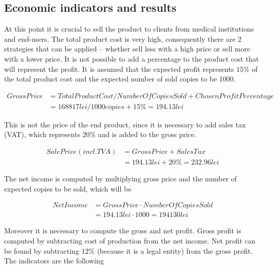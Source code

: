 \documentclass[12pt,a4paper]{report}
\begin{document}
\subsection{Economic indicators and results}
At this point it is crucial to sell the product to clients from medical institutions and end-users. The total product cost is very high, consequently there are 2 strategies that can be applied -- whether sell less with a high price or sell more with a lower price. It is not possible to add a percentage to the product cost that will represent the profit. It is assumed that the expected profit represents $15\%$ of the total product cost and the expected number of sold copies to be 1000. 

\begin{equation}
 \begin{split}
  Gross Price &= Total Product Cost / Number Of Copies Sold + Chosen Profit Percentage\\
              &= 168817 lei/1000 copies + 15\% = 194.13 lei
 \end{split}
\end{equation}

This is not the price of the end product, since it is necessary to add sales tax (VAT), which represents $20\%$ and is added to the gross price. 

\begin{equation}
 \begin{split}
  Sale Price (incl. TVA) &= Gross Price + Sales Tax\\
              &= 194.13 lei + 20\% = 232.96 lei
 \end{split}
\end{equation}

The net income is computed by multiplying gross price and the number of expected copies to be sold, which will be

\begin{equation}
 \begin{split}
  Net Income &= Gross Price \cdot Number Of Copies Sold\\
              &= 194.13 lei \cdot 1000 = 194130 lei
 \end{split}
\end{equation}

Moreover it is necessary to compute the gross and net profit. Gross profit is computed by subtracting cost of production from the net income. Net profit can be found by subtracting $12\%$ (because it is a legal entity) from the gross profit. The indicators are the following
\end{document}

